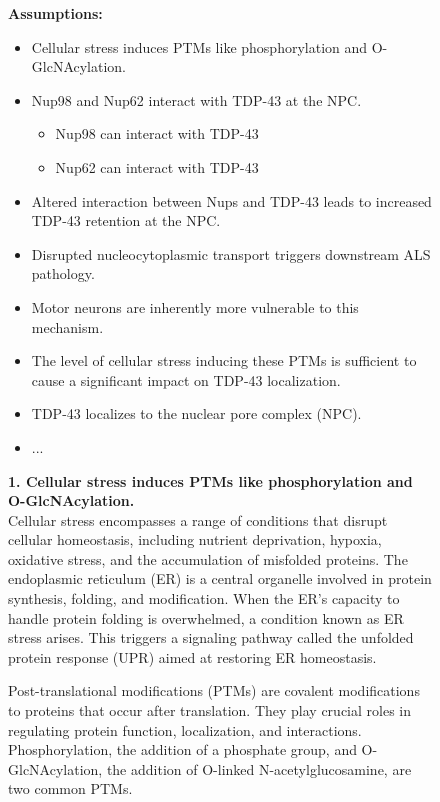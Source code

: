 \begin{figure}[htbp!]
\begin{tcolorbox}[
    colback=black!5!white,
    colframe=black!60!white,
    title=\textbf{Example output of deep verification by the Reflection agent},
    fonttitle=\bfseries,
    arc=3mm,
    boxrule=1pt,
    bottomrule=2pt,
]
\footnotesize
\textbf{Assumptions:}
\begin{itemize}
    \item Cellular stress induces PTMs like phosphorylation and O-GlcNAcylation.
    \item Nup98 and Nup62 interact with TDP-43 at the NPC.
    \begin{itemize}
        \item Nup98 can interact with TDP-43
        \item Nup62 can interact with TDP-43
    \end{itemize}
    \item Altered interaction between Nups and TDP-43 leads to increased TDP-43 retention at the NPC.
    \item Disrupted nucleocytoplasmic transport triggers downstream ALS pathology.
    \item Motor neurons are inherently more vulnerable to this mechanism.
    \item The level of cellular stress inducing these PTMs is sufficient to cause a significant impact on TDP-43 localization.
    \item TDP-43 localizes to the nuclear pore complex (NPC).
    \item ...
\end{itemize}

\textbf{1. Cellular stress induces PTMs like phosphorylation and O-GlcNAcylation.}\\
Cellular stress encompasses a range of conditions that disrupt cellular homeostasis, including nutrient deprivation, hypoxia, oxidative stress, and the accumulation of misfolded proteins. The endoplasmic reticulum (ER) is a central organelle involved in protein synthesis, folding, and modification. When the ER's capacity to handle protein folding is overwhelmed, a condition known as ER stress arises. This triggers a signaling pathway called the unfolded protein response (UPR) aimed at restoring ER homeostasis.

Post-translational modifications (PTMs) are covalent modifications to proteins that occur after translation. They play crucial roles in regulating protein function, localization, and interactions. Phosphorylation, the addition of a phosphate group, and O-GlcNAcylation, the addition of O-linked N-acetylglucosamine, are two common PTMs.


\end{tcolorbox}
\end{figure}
